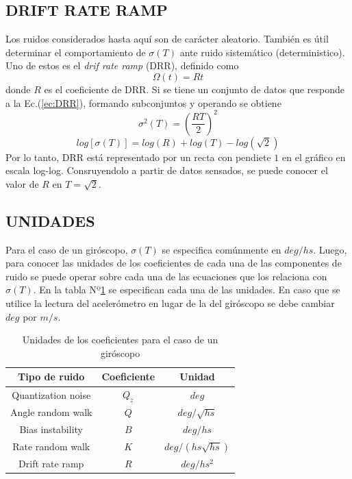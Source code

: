 \documentclass[a4paper,11pt,twoside]{IT-CNEA}
\begin{document}
\subsection{DRIFT RATE RAMP}
Los ruidos considerados hasta aquí son de carácter aleatorio. También es útil determinar el comportamiento de $\sigma(T)$ ante ruido sistemático (deterministico). Uno de estos es el \textit{drif rate ramp} (DRR), definido como
\begin{equation}
\Omega(t)=Rt
\label{ec:DRR}
\end{equation}
donde $R$ es el coeficiente de DRR. Si se tiene un conjunto de datos que responde a la Ec.(\ref{ec:DRR}), formando subconjuntos y operando se obtiene
\begin{equation}
\sigma^2(T)=\left( \frac{RT}{2}\right)^2
\label{ec:AVDDR}
\end{equation}
\begin{equation}
log\left[ \sigma(T)\right]=log(R)+log(T)-log\left( \sqrt{2}\right)
\end{equation}
Por lo tanto, DRR está representado por un recta con pendiete $1$ en el gráfico en escala log-log. Consruyendolo a partir de datos sensados, se puede conocer el valor de $R$ en $T=\sqrt{2}$.
\subsection{UNIDADES}
Para el caso de un giróscopo, $\sigma(T)$ se especifica comúnmente en $deg/hs$. Luego, para conocer las unidades de los coeficientes de cada una de las componentes de ruido se puede operar sobre cada una de las ecuaciones que los relaciona con $\sigma(T)$. En la tabla Nº\ref{tabla:unidadesCoeficientes} se especifican cada una de las unidades. En caso que se utilice la lectura del acelerómetro en lugar de la del giróscopo se debe cambiar $deg$ por $m/s$.
\begin{table}[h!]
\centering
\caption{Unidades de los coeficientes para el caso de un giróscopo}
\label{tabla:unidadesCoeficientes}
\begin{tabular}{|c|c|c|}
\hline
Tipo de ruido&Coeficiente& Unidad \\ \hline
Quantization noise&$Q_z$&$deg$ \\ \hline
Angle random walk&$Q$&$deg/\sqrt{hs}$ \\ \hline
Bias instability&$B$&$deg/hs$ \\ \hline
Rate random walk&$K$&$deg/\left( hs\sqrt{hs}\right)$ \\ \hline
Drift rate ramp&$R$&$deg/hs^2$ \\ \hline
\end{tabular}
\end{table}
\clearpage
\newpage
\end{document}
